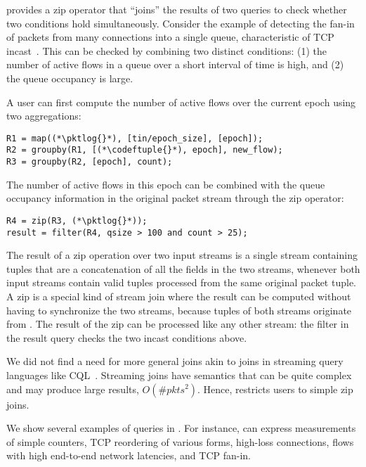  \TheSystem provides a {\ct zip} operator
that ``joins'' the results of two queries to check whether two conditions hold
simultaneously. Consider the example of detecting the fan-in of packets from
many connections into a single queue, characteristic of TCP
incast~\cite{tcpincast}. This can be checked by combining two distinct
conditions: (1) the number of active flows in a queue over a short interval of
time is high, and (2) the queue occupancy is large.

A user can first compute the number of active flows over the current epoch using
two aggregations:
\begin{lstlisting}
R1 = map((*\pktlog{}*), [tin/epoch_size], [epoch]);
R2 = groupby(R1, [(*\codeftuple{}*), epoch], new_flow);
R3 = groupby(R2, [epoch], count);
\end{lstlisting}
The number of active flows in this epoch can be combined with the queue
occupancy information in the original packet stream through the {\ct zip}
operator:
\begin{lstlisting}
R4 = zip(R3, (*\pktlog{}*));
result = filter(R4, qsize > 100 and count > 25);
\end{lstlisting}
The result of a {\ct zip} operation over two input streams is a single stream
containing tuples that are a concatenation
of all the fields in the two streams, whenever both input streams contain valid
tuples processed from the same original packet tuple. A {\ct zip} is a special
kind of stream join where the result can be computed without having to synchronize
the two streams, because tuples of both streams originate from {\ct \pktlog}. The result
of the {\ct zip} can be processed like any other stream:
the {\ct filter} in the {\ct result} query checks the two incast
conditions above.

We did not find a need for more general joins akin to joins in streaming query languages
like CQL~\cite{cql-vldb}. Streaming joins have semantics that can be quite
complex and may produce large results, \ie $O(\#pkts^2)$.
Hence, \TheSystem restricts users to simple {\ct zip} joins.

We show several examples of \TheSystem queries in .
For instance, \TheSystem can express measurements of simple counters, TCP
reordering of various forms, high-loss connections, flows with high end-to-end
network latencies, and TCP fan-in. 


